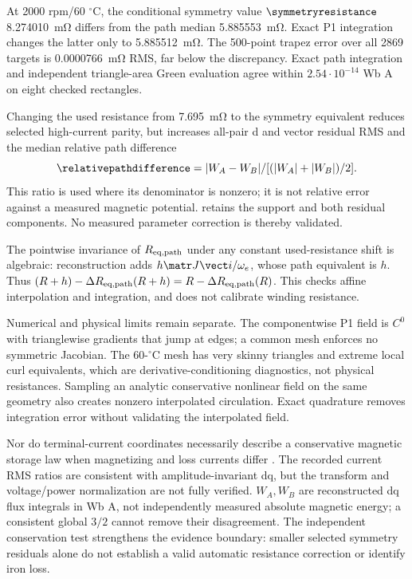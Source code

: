 At 2000 rpm/60 $^\circ$C, the conditional symmetry value $\symmetryresistance$
\SI{8.274010}{\milli\ohm} differs from the path median
\SI{5.885553}{\milli\ohm}. Exact P1 integration changes the latter only to
\SI{5.885512}{\milli\ohm}. The 500-point trapez error over all 2869 targets
is \SI{0.0000766}{\milli\ohm} RMS, far below the discrepancy. Exact path
integration and independent triangle-area Green evaluation agree within
$2.54\cdot10^{-14}$ Wb A on eight checked rectangles.

Changing the used resistance from \SI{7.695}{\milli\ohm} to the symmetry
equivalent reduces selected high-current parity, but increases all-pair d
and vector residual RMS and the median relative path difference
\begin{equation}
 \relativepathdifference=|W_A-W_B|/[(|W_A|+|W_B|)/2].
\end{equation}
This ratio is used where its denominator is nonzero; it is not relative error
against a measured magnetic potential.  retains
the support and both residual
components. No measured parameter correction is thereby validated.
\begin{table}[tb]
\centering\small

\caption{Raw versus symmetry-adjusted resistance hypothesis at
2000 rpm/60 $^\circ$C, on unchanged data. High-current improvement accompanies
worse global d/vector parity and relative path disagreement.}
\label{tab:diagnostic-adjustment}
\end{table}
The pointwise invariance of $R_{\rm eq,path}$ under any constant used-resistance
shift is algebraic: reconstruction adds $h\matr J\vect i/\omega_e$, whose
path equivalent is $h$. Thus $(R+h)-\Delta R_{\rm eq,path}(R+h)
=R-\Delta R_{\rm eq,path}(R)$. This checks affine interpolation and integration,
and does not calibrate winding resistance.

Numerical and physical limits remain separate. The componentwise P1 field is
$C^0$ with trianglewise gradients that jump at edges; a common mesh enforces
no symmetric Jacobian. The 60-$^\circ$C mesh has very skinny triangles and
extreme local curl equivalents, which are derivative-conditioning diagnostics,
not physical resistances. Sampling an analytic conservative nonlinear field
on the same geometry also creates nonzero interpolated circulation. Exact
quadrature removes integration error without validating the interpolated field.

Nor do terminal-current coordinates necessarily describe a conservative
magnetic storage law when magnetizing and loss currents differ
\cite{richter2014}. The recorded current RMS ratios are consistent with
amplitude-invariant dq, but the transform and voltage/power normalization
are not fully verified. $W_A,W_B$ are reconstructed dq flux integrals in Wb A,
not independently measured absolute magnetic energy; a consistent global
$3/2$ cannot remove their disagreement. The independent conservation test
strengthens the evidence boundary: smaller selected symmetry residuals alone
do not establish a valid automatic resistance correction or identify iron loss.
